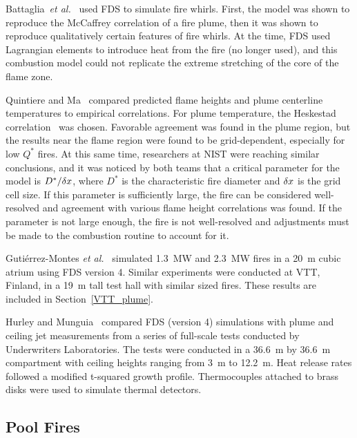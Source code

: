 Battaglia~{\em  et al.}~\cite{Battaglia:1} used  FDS to  simulate fire whirls.   First,  the  model  was  shown to  reproduce  the  McCaffrey correlation  of  a  fire  plume,   then  it  was  shown  to  reproduce qualitatively certain features  of fire whirls. At the  time, FDS used Lagrangian elements to introduce heat  from the fire (no longer used), and this  combustion model could not replicate  the extreme stretching of the core of the flame zone.

Quintiere and Ma~\cite{Ma:2,Ma:3} compared predicted flame heights and plume  centerline temperatures to  empirical correlations.   For plume temperature,   the  Heskestad   correlation~\cite{SFPE:Heskestad}  was chosen.  Favorable  agreement was found  in the plume region,  but the results near  the  flame  region  were found  to  be  grid-dependent, especially for  low $Q^*$  fires.  At this  same time,  researchers at NIST were reaching similar  conclusions, and it  was noticed  by both teams  that a  critical parameter  for the  model is  $D^*/\delta x$, where $D^*$ is the characteristic fire diameter and $\delta x$  is the grid cell size.  If  this parameter  is  sufficiently  large,  the fire  can  be considered well-resolved  and  agreement  with various  flame  height correlations was found. If the parameter is not large enough, the fire is not well-resolved and adjustments  must be made to  the combustion routine to account for it.

Guti\'{e}rrez-Montes {\em et al.}~\cite{Gutierrez:Building_and_Environment} simulated 1.3~MW and 2.3~MW fires in a 20~m cubic atrium using FDS version 4. Similar experiments were conducted at VTT, Finland, in a 19~m tall test hall with similar sized fires. These results are included in Section~\ref{VTT_plume}. 

Hurley and Munguia~\cite{Hurley:GCR09-921,Hurley:JFPE2009} compared FDS (version 4) simulations with plume and ceiling jet measurements from a series of full-scale tests conducted by Underwriters Laboratories. The tests were conducted in a 36.6~m by 36.6~m compartment with ceiling heights ranging from 3~m to 12.2~m. Heat release rates followed a modified t-squared growth profile. Thermocouples attached to brass disks were used to simulate thermal detectors.




\subsection{Pool Fires}


